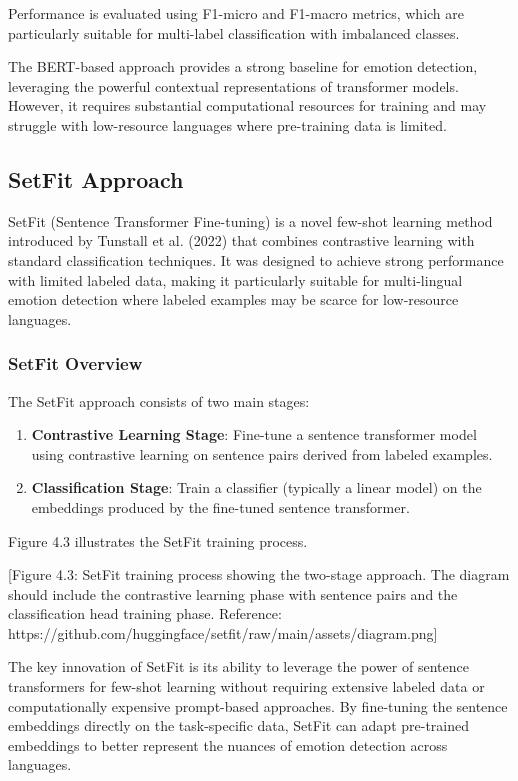 \documentclass[a4paper,12pt]{extarticle}
\begin{document}
Performance is evaluated using F1-micro and F1-macro metrics, which are particularly suitable for multi-label classification with imbalanced classes.

The BERT-based approach provides a strong baseline for emotion detection, leveraging the powerful contextual representations of transformer models. However, it requires substantial computational resources for training and may struggle with low-resource languages where pre-training data is limited.

\subsection{SetFit Approach}

SetFit (Sentence Transformer Fine-tuning) is a novel few-shot learning method introduced by Tunstall et al. (2022) that combines contrastive learning with standard classification techniques. It was designed to achieve strong performance with limited labeled data, making it particularly suitable for multi-lingual emotion detection where labeled examples may be scarce for low-resource languages.

\subsubsection{SetFit Overview}

The SetFit approach consists of two main stages:

\begin{enumerate}
\item \textbf{Contrastive Learning Stage}: Fine-tune a sentence transformer model using contrastive learning on sentence pairs derived from labeled examples.
\item \textbf{Classification Stage}: Train a classifier (typically a linear model) on the embeddings produced by the fine-tuned sentence transformer.
\end{enumerate}

Figure 4.3 illustrates the SetFit training process.

[Figure 4.3: SetFit training process showing the two-stage approach. The diagram should include the contrastive learning phase with sentence pairs and the classification head training phase. Reference: https://github.com/huggingface/setfit/raw/main/assets/diagram.png]

The key innovation of SetFit is its ability to leverage the power of sentence transformers for few-shot learning without requiring extensive labeled data or computationally expensive prompt-based approaches. By fine-tuning the sentence embeddings directly on the task-specific data, SetFit can adapt pre-trained embeddings to better represent the nuances of emotion detection across languages.
\end{document}
